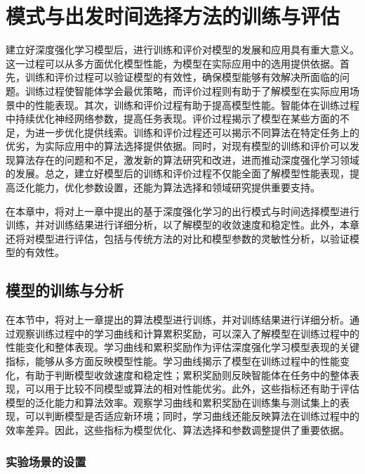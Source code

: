 \chapter{模式与出发时间选择方法的训练与评估}

建立好深度强化学习模型后，进行训练和评价对模型的发展和应用具有重大意义。这一过程可以从多方面优化模型性能，为模型在实际应用中的选用提供依据。首先，训练和评价过程可以验证模型的有效性，确保模型能够有效解决所面临的问题。训练过程使智能体学会最优策略，而评价过程则有助于了解模型在实际应用场景中的性能表现。其次，训练和评价过程有助于提高模型性能。智能体在训练过程中持续优化神经网络参数，提高任务表现。评价过程揭示了模型在某些方面的不足，为进一步优化提供线索。训练和评价过程还可以揭示不同算法在特定任务上的优劣，为实际应用中的算法选择提供依据。同时，对现有模型的训练和评价可以发现算法存在的问题和不足，激发新的算法研究和改进，进而推动深度强化学习领域的发展。总之，建立好模型后的训练和评价过程不仅能全面了解模型性能表现，提高泛化能力，优化参数设置，还能为算法选择和领域研究提供重要支持。


在本章中，将对上一章中提出的基于深度强化学习的出行模式与时间选择模型进行训练，并对训练结果进行详细分析，以了解模型的收敛速度和稳定性。此外，本章还将对模型进行评估，包括与传统方法的对比和模型参数的灵敏性分析，以验证模型的有效性。


\section{模型的训练与分析}

在本节中，将对上一章提出的算法模型进行训练，并对训练结果进行详细分析。通过观察训练过程中的学习曲线和计算累积奖励，可以深入了解模型在训练过程中的性能变化和整体表现。学习曲线和累积奖励作为评估深度强化学习模型表现的关键指标，能够从多方面反映模型性能。学习曲线揭示了模型在训练过程中的性能变化，有助于判断模型收敛速度和稳定性；累积奖励则反映智能体在任务中的整体表现，可以用于比较不同模型或算法的相对性能优劣。此外，这些指标还有助于评估模型的泛化能力和算法效率。观察学习曲线和累积奖励在训练集与测试集上的表现，可以判断模型是否适应新环境；同时，学习曲线还能反映算法在训练过程中的效率差异。因此，这些指标为模型优化、算法选择和参数调整提供了重要依据。

\subsection{实验场景的设置}

